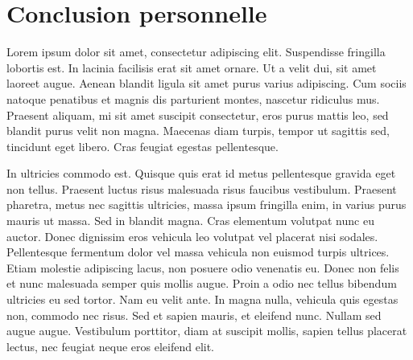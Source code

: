 \documentclass[a4paper,12pt]{report}
\begin{document}
\section*{Conclusion personnelle}
Lorem ipsum dolor sit amet, consectetur adipiscing elit. Suspendisse
fringilla lobortis est. In lacinia facilisis erat sit amet ornare. Ut
a velit dui, sit amet laoreet augue. Aenean blandit ligula sit amet
purus varius adipiscing. Cum sociis natoque penatibus et magnis dis
parturient montes, nascetur ridiculus mus. Praesent aliquam, mi sit
amet suscipit consectetur, eros purus mattis leo, sed blandit purus
velit non magna. Maecenas diam turpis, tempor ut sagittis sed,
tincidunt eget libero. Cras feugiat egestas pellentesque.

In ultricies commodo est. Quisque quis erat id metus pellentesque
gravida eget non tellus. Praesent luctus risus malesuada risus
faucibus vestibulum. Praesent pharetra, metus nec sagittis ultricies,
massa ipsum fringilla enim, in varius purus mauris ut massa. Sed in
blandit magna. Cras elementum volutpat nunc eu auctor. Donec dignissim
eros vehicula leo volutpat vel placerat nisi sodales. Pellentesque
fermentum dolor vel massa vehicula non euismod turpis ultrices. Etiam
molestie adipiscing lacus, non posuere odio venenatis eu. Donec non
felis et nunc malesuada semper quis mollis augue. Proin a odio nec
tellus bibendum ultricies eu sed tortor. Nam eu velit ante. In magna
nulla, vehicula quis egestas non, commodo nec risus. Sed et sapien
mauris, et eleifend nunc. Nullam sed augue augue. Vestibulum
porttitor, diam at suscipit mollis, sapien tellus placerat lectus, nec
feugiat neque eros eleifend elit.
\end{document}
